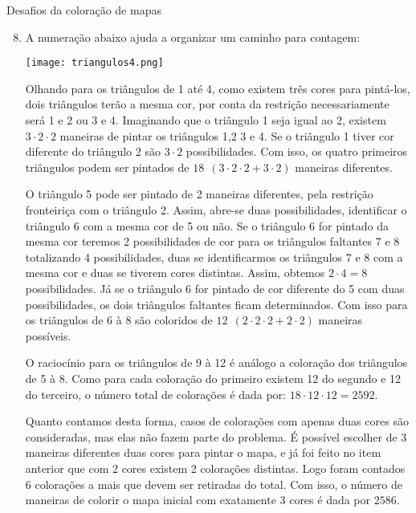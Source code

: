 \begin{answer}{Desafios da coloração de mapas}
{
\begin{enumerate}[wide]\setcounter{enumi}{7}\small

\item A numeração abaixo ajuda a organizar um caminho para contagem: 
\begin{center}
\texttt{[image: triangulos4.png]}  
\end{center}

Olhando para os triângulos de 1 até 4, como existem três cores para pintá-los, dois triângulos terão a mesma cor, por conta da restrição necessariamente será 1 e 2 ou 3 e 4. Imaginando que o triângulo 1 seja igual ao 2, existem $3 \cdot 2\cdot 2 $ maneiras de pintar os triângulos 1,2 3 e 4.  Se o triângulo 1 tiver cor  diferente do triângulo 2 são $3\cdot2 $ possibilidades. Com isso, os quatro primeiros triângulos podem ser pintados de $18 ~~ (3 \cdot 2\cdot 2 +3\cdot2)$ maneiras diferentes. 

O triângulo 5 pode ser pintado de 2 maneiras diferentes, pela restrição fronteiriça com o triângulo 2. Assim, abre-se duas possibilidades, identificar o triângulo 6 com a mesma cor de 5 ou não. Se o triângulo 6 for pintado da mesma cor teremos 2 possibilidades de cor para os triângulos faltantes 7 e 8 totalizando 4 possibilidades, duas se identificarmos os triângulos 7 e 8 com a mesma cor e duas se tiverem cores distintas. Assim, obtemos $2 \cdot 4 = 8$ possibilidades. Já se o triângulo 6 for pintado de cor diferente do 5 com duas possibilidades, os dois triângulos faltantes ficam determinados. Com isso para os triângulos de 6 à 8 são coloridos de $ 12~ ~ (2 \cdot 2 \cdot 2+ 2 \cdot 2)$ maneiras possíveis. 

O raciocínio para os triângulos de 9 à 12 é análogo a coloração dos triângulos de 5 à 8. Como para cada coloração do primeiro existem 12 do segundo e 12 do terceiro, o número total de colorações é dada por: $18 \cdot 12 \cdot 12 = 2592$.


Quanto contamos desta forma, casos de colorações com apenas duas cores são consideradas, mas elas não fazem parte do problema. É possível escolher de 3 maneiras diferentes duas cores para pintar o mapa, e já foi feito no item anterior que com 2 cores existem 2 colorações distintas. Logo foram contados 6 colorações a mais que devem ser retiradas do total. Com isso, o número de maneiras de colorir o mapa inicial com exatamente 3 cores é dada por $2586.$ 


\end{enumerate}}
\end{answer}
